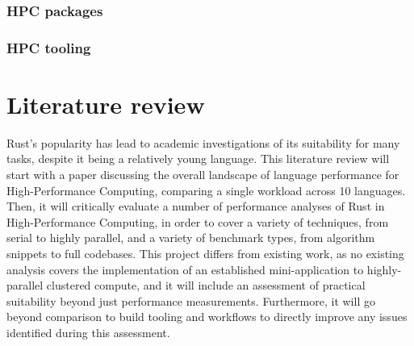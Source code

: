 \subsubsection{HPC packages}
\label{sssec:hpc-packages}

\subsubsection{HPC tooling}
\label{sssec:hpc-tooling}



\section{Literature review} %
\label{sec:literature-review}

Rust's popularity has lead to academic investigations of its suitability for many tasks, despite it being a relatively young language. This literature review will start with a paper discussing the overall landscape of language performance for High-Performance Computing, comparing a single workload across 10 languages. Then, it will critically evaluate a number of performance analyses of Rust in High-Performance Computing, in order to cover a variety of techniques, from serial to highly parallel, and a variety of benchmark types, from algorithm snippets to full codebases. This project differs from existing work, as no existing analysis covers the implementation of an established mini-application to highly-parallel clustered compute, and it will include an assessment of practical suitability beyond just performance measurements. Furthermore, it will go beyond comparison to build tooling and workflows to directly improve any issues identified during this assessment.

